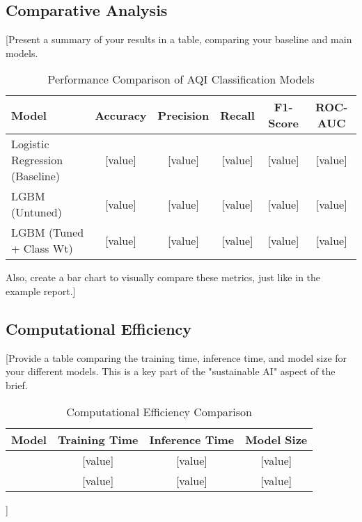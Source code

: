 \documentclass[11pt, a4paper]{article}
\begin{document}
\subsection{Comparative Analysis}
[Present a summary of your results in a table, comparing your baseline and main models.
\begin{table}[H]
    \caption{Performance Comparison of AQI Classification Models}
    \label{tab:lgbm-performance}
    \begin{adjustbox}{width=\textwidth,center}
        \begin{tabular}{l c c c c c}
            \toprule
            \textbf{Model} & \textbf{Accuracy} & \textbf{Precision} & \textbf{Recall} & \textbf{F1-Score} & \textbf{ROC-AUC} \\
            \midrule
            Logistic Regression (Baseline) & [value] & [value] & [value] & [value] & [value] \\
            LGBM (Untuned) & [value] & [value] & [value] & [value] & [value] \\
            LGBM (Tuned + Class Wt) & [value] & [value] & [value] & [value] & [value] \\
            \bottomrule
        \end{tabular}
    \end{adjustbox}
\end{table}
Also, create a bar chart to visually compare these metrics, just like in the example report.]

\subsection{Computational Efficiency}
[Provide a table comparing the training time, inference time, and model size for your different models. This is a key part of the "sustainable AI" aspect of the brief.
\begin{table}[H]
    \caption{Computational Efficiency Comparison}
    \label{tab:efficiency}
    \begin{tabular}{l c c c}
        \toprule
        \textbf{Model} & \textbf{Training Time} & \textbf{Inference Time} & \textbf{Model Size} \\
        \midrule
        [Model 1] & [value] & [value] & [value] \\
        [Model 2] & [value] & [value] & [value] \\
        \bottomrule
    \end{tabular}
\end{table}]
\end{document}
